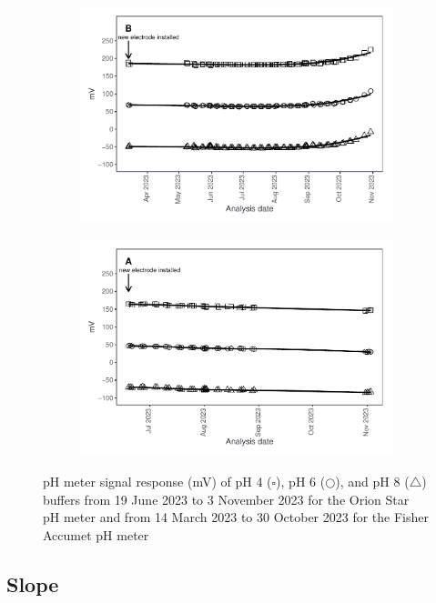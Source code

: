 \documentclass[
]{article}
\begin{document}
\begin{figure}[h]
  \begin{subfigure}{0.48\textwidth}
  \includegraphics[]{fisher_mV.pdf}
  \end{subfigure}%
  \begin{subfigure}{0.48\textwidth}
  \includegraphics[]{orion_mV.pdf}
  \end{subfigure}
\caption{pH meter signal response (mV) of pH 4 ($\square$), pH 6 ($\bigcirc$), and pH 8 ($\bigtriangleup$) buffers from 19 June 2023 to 3 November 2023 for the Orion Star pH meter and from 14 March 2023 to 30 October 2023 for the Fisher Accumet pH meter}
\end{figure}

\hypertarget{slope}{%
\subsection{Slope}\label{slope}}
\end{document}
